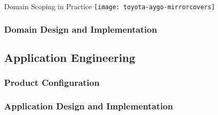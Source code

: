 \begin{frame}{Domain Scoping in Practice}
	\centering\texttt{[image: toyota-aygo-mirrorcovers]}
\end{frame}

\subsubsection{Domain Design and Implementation}

\subsection{Application Engineering}

\subsubsection{Product Configuration}
\subsubsection{Application Design and Implementation}

